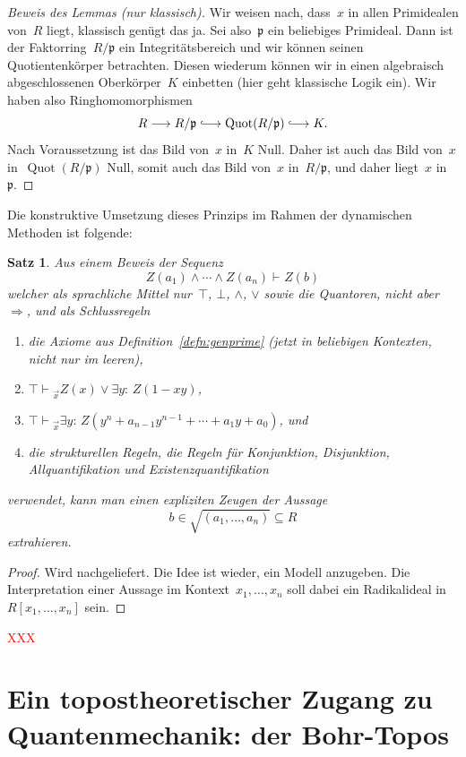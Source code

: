 \documentclass[a4paper,ngerman,12pt]{scrartcl}
\theoremstyle{definition}
\theoremstyle{plain}
\newtheorem{satz}[defn]{Satz}
\theoremstyle{remark}
\newcommand{\lhra}{\ensuremath{\lhook\joinrel\relbar\joinrel\rightarrow}}
\newcommand{\pp}{\mathfrak{p}}
\DeclareMathOperator{\Quot}{Quot}
\newcommand{\seq}[1]{\mathrel{\vdash\!\!\!_{#1}}}
\renewcommand{\_}{\mathpunct{.}\,}
\newcommand{\?}{\,{:}\,}
\newcommand{\XXX}[1]{\textcolor{red}{#1}}
\begin{document}
\begin{proof}[Beweis des Lemmas (nur klassisch)]
Wir weisen nach, dass~$x$ in allen Primidealen von~$R$ liegt, klassisch genügt
das ja. Sei also~$\pp$ ein beliebiges Primideal. Dann ist der
Faktorring~$R/\pp$ ein Integritätsbereich und wir können seinen
Quotientenkörper betrachten. Diesen wiederum können wir in einen algebraisch
abgeschlossenen Oberkörper~$K$ einbetten (hier geht klassische Logik ein). Wir
haben also Ringhomomorphismen
\[ R \longrightarrow R/\pp \lhra \Quot(R/\pp) \lhra K. \]
Nach Voraussetzung ist das Bild von~$x$ in~$K$ Null. Daher ist auch das Bild
von~$x$ in~$\Quot(R/\pp)$ Null, somit auch das Bild von~$x$ in~$R/\pp$, und
daher liegt~$x$ in~$\pp$.
\end{proof}

Die konstruktive Umsetzung dieses Prinzips im Rahmen der dynamischen Methoden
ist folgende:

\begin{satz}
Aus einem Beweis der Sequenz
\[ Z(a_1) \wedge \cdots \wedge Z(a_n) \seq{} Z(b) \]
welcher als sprachliche Mittel nur~$\top$, $\bot$, $\wedge$, $\vee$ sowie die
Quantoren, nicht aber~$\Rightarrow$, und als Schlussregeln
\begin{enumerate}
\item[1.] die Axiome aus Definition~\ref{defn:genprime} (jetzt in beliebigen
Kontexten, nicht nur im leeren),
\item[2.] $\top \seq{\vec x} Z(x) \vee \exists y{:}\, Z(1-xy)$,
\item[3.] $\top \seq{\vec x} \exists y{:}\, Z(y^n + a_{n-1}y^{n-1} + \cdots +
a_1y + a_0)$, und
\item[4.] die strukturellen Regeln, die Regeln für Konjunktion, Disjunktion,
Allquantifikation und Existenzquantifikation
\end{enumerate}
verwendet, kann man einen expliziten Zeugen der Aussage
\[ b \in \sqrt{(a_1,\ldots,a_n)} \subseteq R \]
extrahieren.
\end{satz}
\begin{proof}Wird nachgeliefert. Die Idee ist wieder, ein Modell anzugeben. Die
Interpretation einer Aussage im Kontext~$x_1,\ldots,x_n$ soll dabei ein
Radikalideal in~$R[x_1,\ldots,x_n]$ sein.\end{proof}
\XXX{XXX}


\section{Ein topostheoretischer Zugang zu Quantenmechanik: der Bohr-Topos}
\end{document}
